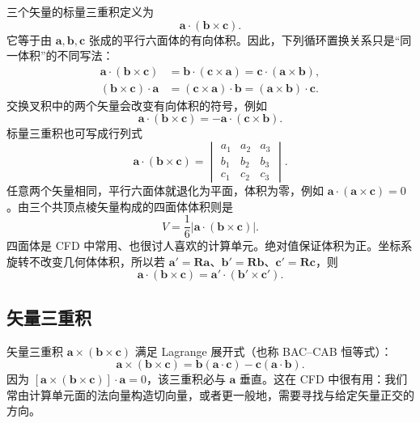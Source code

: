 \documentclass[11pt,a4paper,openany,fontset=none]{ctexbook}
\begin{document}
三个矢量的标量三重积定义为
\begin{equation} \bm a\cdot(\bm b\times\bm c). \tag{1.2.12}\end{equation}
它等于由 $\bm a,\bm b,\bm c$ 张成的平行六面体的有向体积。因此，下列循环置换关系只是“同一体积”的不同写法：
\begin{align}
 \bm a\cdot(\bm b\times\bm c)&=\bm b\cdot(\bm c\times\bm a)=\bm c\cdot(\bm a\times\bm b), \tag{1.2.13}\\
 (\bm b\times\bm c)\cdot\bm a&=(\bm c\times\bm a)\cdot\bm b=(\bm a\times\bm b)\cdot\bm c. \tag{1.2.14}
\end{align}
交换叉积中的两个矢量会改变有向体积的符号，例如
\begin{equation}
 \bm a\cdot(\bm b\times\bm c)=-\bm a\cdot(\bm c\times\bm b). \tag{1.2.15}
\end{equation}
标量三重积也可写成行列式
\begin{equation}
 \bm a\cdot(\bm b\times\bm c)=
 \begin{vmatrix}a_1&a_2&a_3\\b_1&b_2&b_3\\c_1&c_2&c_3\end{vmatrix}. \tag{1.2.18}
\end{equation}
任意两个矢量相同，平行六面体就退化为平面，体积为零，例如 $\bm a\cdot(\bm a\times\bm c)=0$。由三个共顶点棱矢量构成的四面体体积则是
\begin{equation}
 V=\frac16\left|\bm a\cdot(\bm b\times\bm c)\right|. \tag{1.2.20}
\end{equation}
四面体是 CFD 中常用、也很讨人喜欢的计算单元。绝对值保证体积为正。坐标系旋转不改变几何体体积，所以若 $\bm a'=\bm R\bm a$、$\bm b'=\bm R\bm b$、$\bm c'=\bm R\bm c$，则
\begin{equation}
 \bm a\cdot(\bm b\times\bm c)=\bm a'\cdot(\bm b'\times\bm c'). \tag{1.2.21}
\end{equation}

\subsection{矢量三重积}

矢量三重积 $\bm a\times(\bm b\times\bm c)$ 满足 Lagrange 展开式（也称 BAC--CAB 恒等式）：
\begin{equation}
 \bm a\times(\bm b\times\bm c)=\bm b(\bm a\cdot\bm c)-\bm c(\bm a\cdot\bm b). \tag{1.2.24}
\end{equation}
因为 $[\bm a\times(\bm b\times\bm c)]\cdot\bm a=0$，该三重积必与 $\bm a$ 垂直。这在 CFD 中很有用：我们常由计算单元面的法向量构造切向量，或者更一般地，需要寻找与给定矢量正交的方向。
\end{document}
